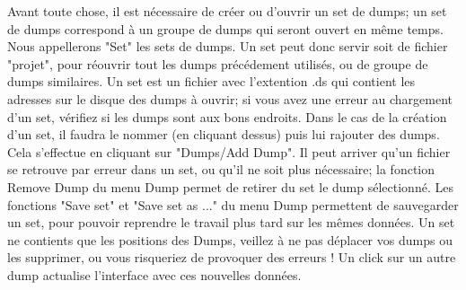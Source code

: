 Avant toute chose, il est nécessaire de créer ou d'ouvrir un set de dumps; un set de dumps correspond à un groupe de dumps qui seront ouvert en même temps. Nous appellerons "Set" les sets de dumps.
Un set peut donc servir soit de fichier "projet", pour réouvrir tout les dumps précédement utilisés, ou de groupe de dumps similaires.
Un set est un fichier avec l'extention .ds qui contient les adresses sur le disque des dumps à ouvrir; si vous avez une erreur au chargement d'un set, vérifiez si les dumps sont aux bons endroits.
Dans le cas de la création d'un set, il faudra le nommer (en cliquant dessus) puis lui rajouter des dumps. Cela s'effectue en cliquant sur "Dumps/Add Dump".
Il peut arriver qu'un fichier se retrouve par erreur dans un set, ou qu'il ne soit plus nécessaire; la fonction Remove Dump du menu Dump permet de retirer du set le dump sélectionné.
Les fonctions "Save set" et "Save set as ..." du menu Dump permettent de sauvegarder un set, pour pouvoir reprendre le travail plus tard sur les mêmes données. Un set ne contients que les positions des Dumps, veillez à ne pas déplacer vos dumps ou les supprimer, ou vous risqueriez de provoquer des erreurs !
Un click sur un autre dump actualise l'interface avec ces nouvelles données.